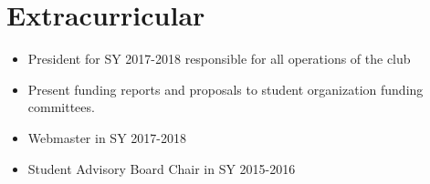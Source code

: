 \documentclass{resume}
\begin{document}
\section{%
Extracurricular}
\begin{itemize}[noitemsep,nolistsep]
  \item President for SY 2017-2018 responsible for all operations of the club
  \item Present funding reports and proposals to student organization funding committees.
\end{itemize}

\begin{itemize}[noitemsep,nolistsep]
  \item Webmaster in SY 2017-2018
  \item Student Advisory Board Chair in SY 2015-2016
\end{itemize}




%
%
\end{document}
